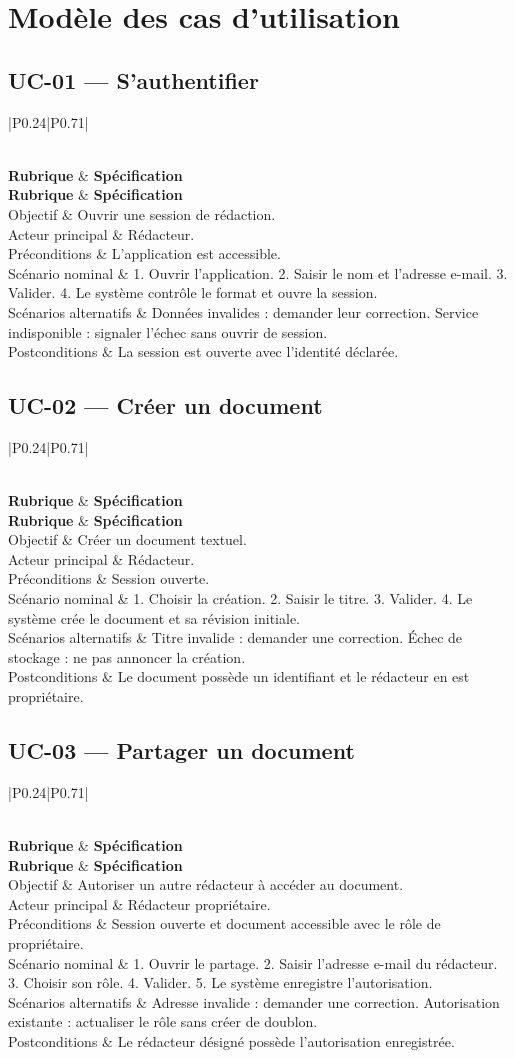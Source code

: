 \section{Modèle des cas d'utilisation}

\newcommand{\fichecas}[8]{%
\subsection{#1 --- #2}
\begingroup\small\setlength{\tabcolsep}{4pt}\renewcommand{\arraystretch}{1.2}
\begin{longtable}{|P{0.24\textwidth}|P{0.71\textwidth}|}
\caption{Fiche du cas #1}\\
\hline
\textbf{Rubrique} & \textbf{Spécification} \\ \hline
\endfirsthead
\hline
\textbf{Rubrique} & \textbf{Spécification} \\ \hline
\endhead
\endfoot
Objectif & #3 \\ \hline
Acteur principal & #4 \\ \hline
Préconditions & #5 \\ \hline
Scénario nominal & #6 \\ \hline
Scénarios alternatifs & #7 \\ \hline
Postconditions & #8 \\ \hline
\end{longtable}\endgroup
}

\fichecas
{UC-01}{S'authentifier}
{Ouvrir une session de rédaction.}
{Rédacteur.}
{L'application est accessible.}
{1. Ouvrir l'application. 2. Saisir le nom et l'adresse e-mail. 3. Valider. 4. Le système contrôle le format et ouvre la session.}
{Données invalides : demander leur correction. Service indisponible : signaler l'échec sans ouvrir de session.}
{La session est ouverte avec l'identité déclarée.}

\fichecas
{UC-02}{Créer un document}
{Créer un document textuel.}
{Rédacteur.}
{Session ouverte.}
{1. Choisir la création. 2. Saisir le titre. 3. Valider. 4. Le système crée le document et sa révision initiale.}
{Titre invalide : demander une correction. Échec de stockage : ne pas annoncer la création.}
{Le document possède un identifiant et le rédacteur en est propriétaire.}

\fichecas
{UC-03}{Partager un document}
{Autoriser un autre rédacteur à accéder au document.}
{Rédacteur propriétaire.}
{Session ouverte et document accessible avec le rôle de propriétaire.}
{1. Ouvrir le partage. 2. Saisir l'adresse e-mail du rédacteur. 3. Choisir son rôle. 4. Valider. 5. Le système enregistre l'autorisation.}
{Adresse invalide : demander une correction. Autorisation existante : actualiser le rôle sans créer de doublon.}
{Le rédacteur désigné possède l'autorisation enregistrée.}

